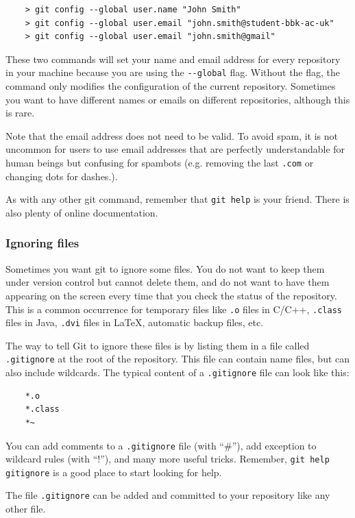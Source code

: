\begin{verbatim}
    > git config --global user.name "John Smith"
    > git config --global user.email "john.smith@student-bbk-ac-uk"
    > git config --global user.email "john.smith@gmail"
\end{verbatim}

These two commands will set your name and email address for every
repository in your machine because you are using the \verb+--global+
flag. Without the flag, the command only modifies the configuration of
the current repository. Sometimes you want to have different names or
emails on different repositories, although this is rare. 

Note that the email address does not need to be valid. To avoid spam,
it is not uncommon for users to use email addresses that are perfectly
understandable for human beings but confusing for spambots
(e.g. removing the last \verb+.com+ or changing dots for dashes.).

As with any other git command, remember that \verb+git help+ is your
friend. There is also plenty of online documentation. 

\subsubsection{Ignoring files}
\label{sec:ignoring-files}

Sometimes you want git to ignore some files. You do not want to keep
them under version control but cannot delete them, and do not want to
have them appearing on the screen every time that you check the status
of the repository. This is a common occurrence for temporary files
like \verb+.o+ files in C/C++, \verb+.class+ files in Java,
\verb+.dvi+ files in \LaTeX, automatic backup files, etc.

The way to tell Git to ignore these files is by listing them in a file
called \verb+.gitignore+ at the root of the repository. This file can
contain name files, but can also include wildcards. The typical
content of a \verb+.gitignore+ file can look like this:

\begin{verbatim}
    *.o
    *.class
    *~
\end{verbatim}

You can add comments to a \verb+.gitignore+ file (with ``\#''), add
exception to wildcard rules (with ``!''), and many more useful
tricks. Remember, \verb+git help gitignore+ is a good place to start
looking for help. 

The file \verb+.gitignore+ can be added and committed to your
repository like any other file.





